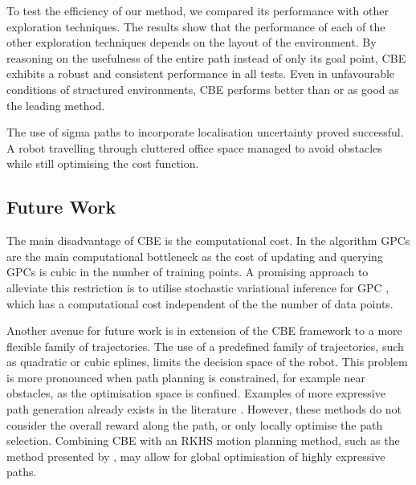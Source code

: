 \documentclass[shortAfour,sageh,times]{sagej_no_sage}
\begin{document}
To test the efficiency of our method, we compared its performance with other exploration techniques. The results show that the performance of each of the other exploration techniques depends on the layout of the environment. By reasoning on the usefulness of the entire path instead of only its goal point, CBE exhibits a robust and consistent performance in all tests. Even in unfavourable conditions of structured environments, CBE performs better than or as good as the leading method. 

The use of sigma paths to incorporate localisation uncertainty proved successful. A robot travelling through cluttered office space managed to avoid obstacles while still optimising the cost function.

\subsection{Future Work}
\label{subsec:future}
The main disadvantage of CBE is the computational cost. In the algorithm GPCs are the main computational bottleneck as the cost of updating and querying GPCs is cubic in the number of training points. A promising approach to alleviate this restriction is to utilise stochastic variational inference for GPC \citep{hensman2015scalable}, which has a computational cost independent of the the number of data points. 

Another avenue for future work is in extension of the CBE framework to a more flexible family of trajectories. The use of a predefined family of trajectories, such as quadratic or cubic splines, limits the decision space of the robot. This problem is more pronounced when path planning is constrained, for example near obstacles, as the optimisation space is confined. Examples of more expressive path generation already exists in the literature \citep{Yang2013, Charrow-RSS-15}. However, these methods do not consider the overall reward along the path, or only locally optimise the path selection. Combining CBE with an RKHS motion planning method, such as the method presented by \citet{Marinho2016}, may allow for global optimisation of highly expressive paths. 


\end{document}
